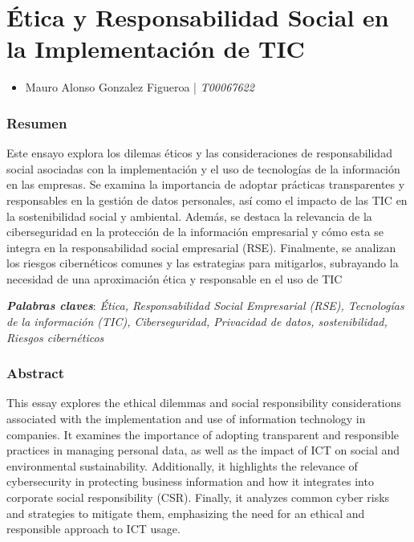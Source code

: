 \documentclass[letterpaper, 12pt]{report}
\newcommand{\bolditalic}[1]{\textbf{\textit{#1}}}
\begin{document}
\chapter*{Ética y Responsabilidad Social en la Implementación de TIC}

\noindent\makebox[\linewidth]{\rule{\textwidth}{0.4pt}}

\begin{itemize}[label=$\triangleright$]
	\item Mauro Alonso Gonzalez Figueroa | \textit{T00067622}
\end{itemize}

\noindent\makebox[\linewidth]{\rule{\textwidth}{0.4pt}}

\subsection*{Resumen}

Este ensayo explora los dilemas éticos y las consideraciones de responsabilidad
social asociadas con la implementación y el uso de tecnologías de la
información en las empresas. Se examina la importancia de adoptar prácticas
transparentes y responsables en la gestión de datos personales, así como el
impacto de las TIC en la sostenibilidad social y ambiental. Además, se destaca
la relevancia de la ciberseguridad en la protección de la información
empresarial y cómo esta se integra en la responsabilidad social empresarial
(RSE). Finalmente, se analizan los riesgos cibernéticos comunes y las
estrategias para mitigarlos, subrayando la necesidad de una aproximación ética
y responsable en el uso de TIC\@{}

\bolditalic{Palabras claves}: \textit{Ética, Responsabilidad Social Empresarial (RSE), Tecnologías de la información (TIC), Ciberseguridad, Privacidad de datos, sostenibilidad, Riesgos cibernéticos}

\subsection*{Abstract}

This essay explores the ethical dilemmas and social responsibility
considerations associated with the implementation and use of information
technology in companies. It examines the importance of adopting transparent and
responsible practices in managing personal data, as well as the impact of ICT
on social and environmental sustainability. Additionally, it highlights the
relevance of cybersecurity in protecting business information and how it
integrates into corporate social responsibility (CSR). Finally, it analyzes
common cyber risks and strategies to mitigate them, emphasizing the need for an
ethical and responsible approach to ICT usage.
\end{document}
